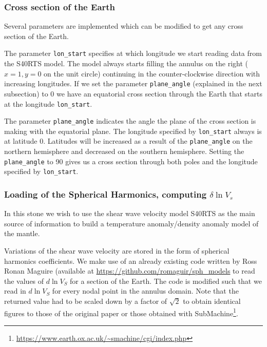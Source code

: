 \subsubsection*{Cross section of the Earth}

Several parameters are implemented which can be modified to get any cross section of the Earth. 

The parameter \texttt{lon\_start} specifies at which longitude we start reading data from the S40RTS model. The model always starts filling the annulus on the right ($x=1, y=0$ on the unit circle) continuing in the counter-clockwise direction with increasing longitudes. If we set the parameter \texttt{plane\_angle} (explained in the next subsection) to 0 we have an equatorial cross section through the Earth that starts at the longitude \texttt{lon\_start}.

The parameter \texttt{plane\_angle} indicates the angle the plane of the cross section is making with the equatorial plane. The longitude specified by \texttt{lon\_start} always is at latitude 0. Latitudes will be increased as a result of the \texttt{plane\_angle} on the northern hemisphere and decreased on the southern hemisphere. Setting the \texttt{plane\_angle} to 90 gives us a cross section through both poles and the longitude specified by \texttt{lon\_start}.



\subsubsection*{Loading of the Spherical Harmonics, computing $\delta \ln V_s$}

In this stone we wish to use the shear wave velocity model S40RTS \cite{ridv11} 
as the main source of information 
to build a temperature anomaly/density anomaly model of the mantle. 

Variations of the shear wave velocity are stored in the form of spherical harmonics coefficients. 
We make use of an already existing code written by Ross Ronan Maguire
(available at \url{https://github.com/romaguir/sph_models}
to read the values of $d \ln{V_S}$ for a section of the Earth. 
The code is modified such that we read in $d \ln{V_S}$ for every nodal point in the annulus domain. 
Note that the returned value had to be scaled down by a factor of $\sqrt{2}$ to obtain identical figures to 
those of the original paper or those obtained with SubMachine\footnote{\url{https://www.earth.ox.ac.uk/~smachine/cgi/index.php}}.  




